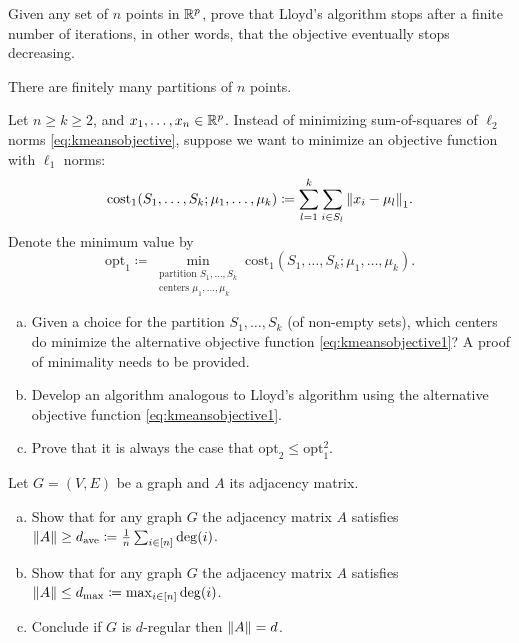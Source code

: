 \begin{myexercise}\label{prob:lloyd_convergence}
    Given any set of $n$ points in $\mathbb{R}^p$, prove that Lloyd's algorithm stops after a finite number of iterations, in other words, that the objective eventually stops decreasing.
\end{myexercise}
\begin{hint}
    There are finitely many partitions of $n$ points.
\end{hint}

\begin{myexercise}\label{prob:lloyd_different_objective}
    Let $n \geq k \geq 2$, and $x_1, \ldots, x_n \in \mathbb{R}^p$. Instead of minimizing sum-of-squares of $\ell_2$ norms \eqref{eq:kmeansobjective}, suppose we want to minimize an objective function with $\ell_1$ norms:
    \begin{equation}\label{eq:kmeansobjective1}
        \text{cost}_1(S_1, \ldots, S_k; \mu_1, \ldots, \mu_k) \coloneqq \sum_{l=1}^k \sum_{i \in S_l} {\left\lVert{x_i - \mu_l}\right\rVert}_1.
    \end{equation}
    Denote the minimum value by
    \begin{equation*}
        \text{opt}_1 \coloneqq \min_{\substack{\text{partition }S_1,\ldots,S_k\\\text{centers }\mu_1, \ldots, \mu_k}} \text{cost}_1(S_1, \ldots, S_k; \mu_1, \ldots, \mu_k).
    \end{equation*}
    \begin{enumerate}[(a)]
        \item Given a choice for the partition $S_1, \ldots, S_k$ (of non-empty sets), which centers do minimize the alternative objective function \eqref{eq:kmeansobjective1}? A proof of minimality needs to be provided.
        \item Develop an algorithm analogous to Lloyd's algorithm using the alternative objective function \eqref{eq:kmeansobjective1}.
        \item Prove that it is always the case that $\text{opt}_2 \leq \text{opt}_1^2$.
    \end{enumerate}
\end{myexercise}

\begin{myexercise}\label{prob:graph_adjacency_matrix}
    Let $G = (V,E)$ be a graph and $A$ its adjacency matrix.
    \begin{enumerate}[(a)]
        \item Show that for any graph $G$ the adjacency matrix $A$ satisfies ${\left\lVert{A}\right\rVert} \geq d_{\text{ave}} \coloneqq \frac{1}{n}\sum_{i \in [n]}\deg(i)$.
        
        \item Show that for any graph $G$ the adjacency matrix $A$ satisfies ${\left\lVert{A}\right\rVert} \leq d_{\text{max}} \coloneqq \max_{i \in [n]}\deg(i)$.
        
        \item Conclude if $G$ is $d$-regular then ${\left\lVert{A}\right\rVert} = d$.
    \end{enumerate} 
\end{myexercise}

